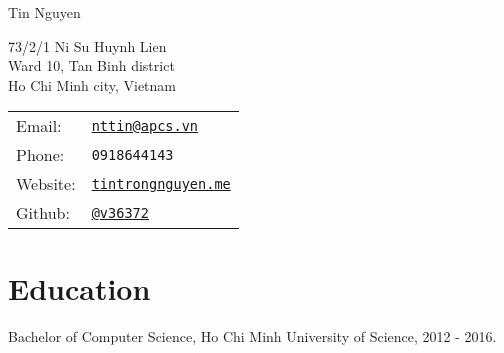 \documentclass[letterpaper]{article}
\def\name{Tin Nguyen}
\renewenvironment{itemize}{
  \begin{list}{}{
    \setlength{\leftmargin}{1.5em}
  }
}{
  \end{list}
}
\begin{document}
{\huge \name}


\vspace{0.25in}

\begin{minipage}{0.45\linewidth}
  73/2/1 Ni Su Huynh Lien\\
  Ward 10, Tan Binh district\\
 Ho Chi Minh city, Vietnam\\
 
\end{minipage}
\begin{minipage}{0.45\linewidth}
  \begin{tabular}{ll}
    Email: & \href{mailto:nttin@apcs.vn}{\tt nttin@apcs.vn} \\
    Phone: & {\tt 0918644143} \\
    Website: & \href{http://tintrongnguyen.me}{\tt tintrongnguyen.me} \\
    Github: & \href{https://github.com/v36372}{\tt @v36372} \\
  \end{tabular}
\end{minipage}

\section*{Education}

\begin{itemize}
  \item Bachelor of Computer Science, Ho Chi Minh University of Science, 2012 - 2016. 
\end{itemize}
\end{document}

